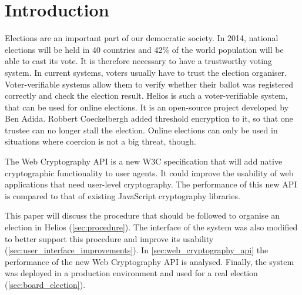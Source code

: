 % 
%

\section{Introduction}

Elections are an important part of our democratic society. In 2014, national elections will be held in 40 countries and 42\% of the world population will be able to cast its vote.\cite{news:economist_2014_ballot_boxes} It is therefore necessary to have a trustworthy voting system. In current systems, voters usually have to trust the election organiser. Voter-verifiable systems allow them to verify whether their ballot was registered correctly and check the election result. Helios is such a voter-verifiable system, that can be used for online elections. It is an open-source project developed by Ben Adida.\cite{site:adida_helios_documentation} Robbert Coeckelbergh added threshold encryption to it, so that one trustee can no longer stall the election.\cite{coeckelbergh_application_and_extension_of_the_helios_voting_system} Online elections can only be used in situations where coercion is not a big threat, though. 

\par The Web Cryptography API is a new W3C specification that will add native cryptographic functionality to user agents.\cite{sleevi_watson_web_cryptography_api} It could improve the usability of web applications that need user-level cryptography. The performance of this new API is compared to that of existing JavaScript cryptography libraries.

\par This paper will discuss the procedure that should be followed to organise an election in Helios (\ref{sec:procedure}). The interface of the system was also modified to better support this procedure and improve its usability (\ref{sec:user_interface_improvements}). In \ref{sec:web_cryptography_api} the performance of the new Web Cryptography API is analysed. Finally, the system was deployed in a production environment and used for a real election (\ref{sec:board_election}).